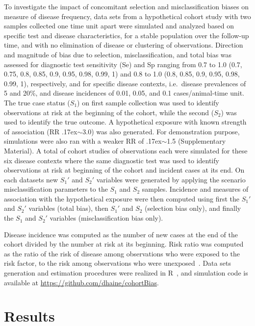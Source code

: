 \documentclass[utf8]{frontiersSCNS}\usepackage[]{graphicx}\usepackage[]{color}
\newcommand{\R}{{\normalfont\textsf{R}}{}}
\begin{document}
To investigate the impact of concomitant selection and misclassification biases
on measure of disease frequency, data sets from a hypothetical cohort study with
two samples collected one time unit apart were simulated and analyzed based on
specific test and disease characteristics, for a stable population over the
follow-up time, and with no elimination of disease or clustering of
observations.
Direction and magnitude of bias due to selection, misclassification, and total
bias was assessed for diagnostic test sensitivity (Se) and Sp 
ranging from 0.7 to 1.0 (0.7, 0.75, 0.8, 0.85, 0.9, 0.95, 0.98, 0.99, 1) and 0.8
to 1.0 (0.8, 0.85, 0.9, 0.95, 0.98, 0.99, 1), respectively, and for specific
disease contexts, i.e.\ disease prevalences of 5 and 20\%, and disease
incidences of 0.01, 0.05, and 0.1 cases/animal-time unit.
The true case status (\(S_1\)) on first sample collection was used to identify
observations at risk at the beginning of the cohort, while the second (\(S_2\))
was used to identify the true outcome.
A hypothetical exposure with known strength of association (RR
\raise.17ex\hbox{$\scriptstyle\sim$}\num{3.0}) was also generated.
For demonstration purpose, simulations were also ran with a weaker RR of
\raise.17ex\hbox{$\scriptstyle\sim$}\num{1.5} (Supplementary Material).
A total of  cohort studies of  observations each
were simulated for these six disease contexts where the same diagnostic test was
used to identify observations at risk at beginning of the cohort and incident
cases at its end.
On each datasets new \(S_{1}'\) and \(S_{2}'\) variables were generated by
applying the scenario misclassification parameters to the \(S_1\) and \(S_2\)
samples.
Incidence and measures of association with the hypothetical exposure were then
computed using first the \(S_{1}'\) and \(S_{2}'\) variables (total bias), then
\(S_{1}'\) and \(S_2\) (selection bias only), and finally the \(S_1\) and
\(S_{2}'\) variables (misclassification bias only).

Disease incidence was computed as the number of new cases at the end of the
cohort divided by the number at risk at its beginning.
Risk ratio was computed as the  ratio of the risk of disease among observations
who were exposed to the risk factor, to the risk among observations who were
unexposed~\citep{Rothman2012}.
Data sets generation and estimation procedures were realized in
\R~\citep{Rsystem}, and simulation code is available at
\url{https://github.com/dhaine/cohortBias}.

\section{Results}
\label{sec:results}
\end{document}
